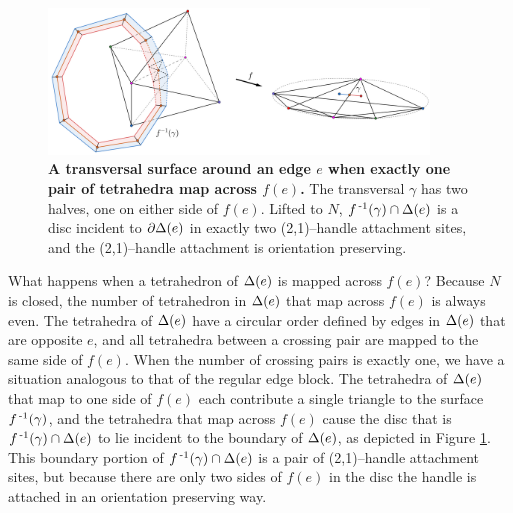 \begin{figure}[h!]
	\centering
	\includegraphics[width=0.9\textwidth]{figures/pl-regular-surface.png}
	\caption{
		\textbf{A transversal surface around an edge $e$ when exactly one pair of tetrahedra map across $f(e)$.}
		The transversal $\gamma$ has two halves, one on either side of $f(e)$.
		Lifted to $N$, $f^{\,\text{-}1}(\gamma)\cap\Delta(e)$ is a disc incident to $\partial\Delta(e)$ in exactly two (2,1)--handle attachment sites, and the (2,1)--handle attachment is orientation preserving.
	}
	\label{fig:pl-regular-surface}
\end{figure}

What happens when a tetrahedron of $\Delta(e)$ is mapped across $f(e)$?
Because $N$ is closed, the number of tetrahedron in $\Delta(e)$ that map across $f(e)$ is always even.
The tetrahedra of $\Delta(e)$ have a circular order defined by edges in $\Delta(e)$ that are opposite $e$, and all tetrahedra between a crossing pair are mapped to the same side of $f(e)$.
When the number of crossing pairs is exactly one, we have a situation analogous to that of the regular edge block.
The tetrahedra of $\Delta(e)$ that map to one side of $f(e)$ each contribute a single triangle to the surface $f^{\,\text{-}1}(\gamma)$, and the tetrahedra that map across $f(e)$ cause the disc that is $f^{\,\text{-}1}(\gamma)\cap\Delta(e)$ to lie incident to the boundary of $\Delta(e)$, as depicted in Figure \ref{fig:pl-regular-surface}.
This boundary portion of $f^{\,\text{-}1}(\gamma)\cap\Delta(e)$ is a pair of (2,1)--handle attachment sites, but because there are only two sides of $f(e)$ in the disc the handle is attached in an orientation preserving way.

